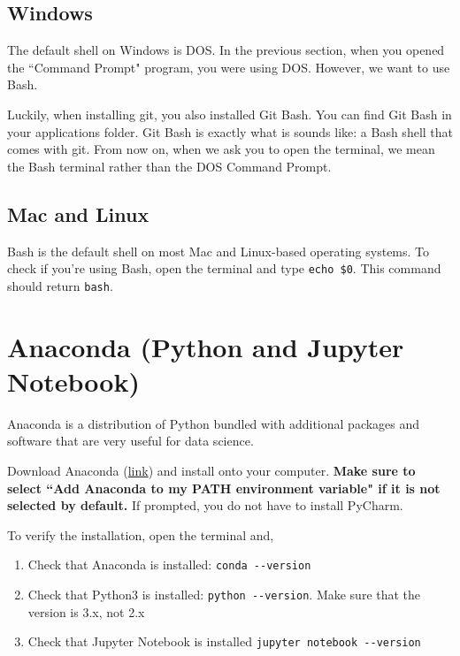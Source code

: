\documentclass[12pt]{article}
\numberwithin{equation}{section}
\begin{document}
	\subsection{Windows}
	The default shell on Windows is DOS.  In the previous section, when you opened the ``Command Prompt" program, you were using DOS. However, we want to use Bash.
	
	Luckily, when installing git, you also installed Git Bash. You can find Git Bash in your applications folder. Git Bash is exactly what is sounds like: a Bash shell that comes with git. From now on, when we ask you to open the terminal, we mean the Bash terminal rather than the DOS Command Prompt.
	
	\subsection{Mac and Linux}
	Bash is the default shell on most Mac and Linux-based operating systems. To check if you're using Bash, open the terminal and type \verb|echo $0|. This command should return \verb|bash|. 
	
	\section{Anaconda (Python and Jupyter Notebook)}
	
	Anaconda is a distribution of Python bundled with additional packages and software that are very useful for data science. 
	
	Download Anaconda (\hyperref{https://www.anaconda.com/products/individual}{}{}{link}) and install onto your computer.  \textbf{Make sure to select ``Add Anaconda to my PATH environment variable" if it is not selected by default.} If prompted, you do not have to install PyCharm.
	
	To verify the installation, open the terminal and,
	\begin{enumerate}
		\item Check that Anaconda is installed: \verb|conda --version|
		\item Check that Python3 is installed: \verb|python --version|. Make sure that the version is 3.x, not 2.x
		\item Check that Jupyter Notebook is installed \verb|jupyter notebook --version|
	\end{enumerate}
	
\end{document}
